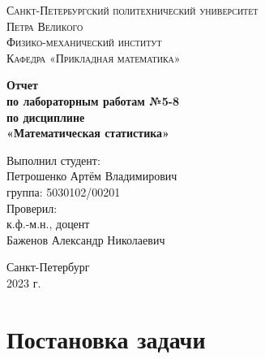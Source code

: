 \documentclass[12pt]{article}
\begin{document}
	\begin{titlepage}
		\begin{center}
			\textsc{Санкт-Петербургский политехнический университет\\Петра Великого\\[5mm]
				Физико-механический институт\\[2mm]
				Кафедра «Прикладная математика»}
			
			\vfill
			
			\textbf{Отчет\\по лабораторным работам №5-8\\по дисциплине\\«Математическая статистика»
				\\[26mm]
			}
		\end{center}
		
		\noindent
		\hspace*{100mm} Выполнил студент:\\[3mm]
		\hspace*{100mm} Петрошенко Артём Владимирович\\
		\hspace*{100mm} группа: 5030102/00201\\[10mm]
		\hspace*{100mm} Проверил:\\[3mm]
		\hspace*{100mm} к.ф.-м.н., доцент\\
		\hspace*{100mm} Баженов Александр Николаевич
		
		\vspace*{\fill}
		\begin{center}
			Санкт-Петербург\\2023 г.
		\end{center}
	\end{titlepage}
	
	\newpage
	\tableofcontents
	\newpage
	\listoffigures
	\newpage
	\listoftables
	\newpage
	
	\section{Постановка задачи}
	
\end{document}
